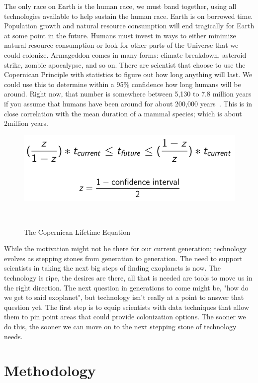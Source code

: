 \documentclass[letterpaper, 10 pt, conference]{ieeeconf}  %
\begin{document}
The only race on Earth is the human race, we must band together, using all technologies available to help sustain the human race. Earth is on borrowed time. Population growth and natural resource consumption will end tragically for Earth at some point in the future. Humans must invest in ways to either minimize natural resource consumption or look for other parts of the Universe that we could colonize. Armageddon comes in many forms: climate breakdown, asteroid strike, zombie apocalypse, and so on. There are scientist that choose to use the Copernican Principle with statistics to figure out how long anything will last. We could use this to determine within a 95\% confidence how long humans will be around. Right now, that number is somewhere between 5,130 to 7.8 million years if you assume that humans have been around for about 200,000 years~\cite{Koehrsen2018}. This is in close correlation with the mean duration of a mammal species; which is about 2million years. 

\begin{figure}
	\centering
	\includegraphics[width=0.7\linewidth]{Images/Formula}
	\caption[The Copernican Lifetime Equation]{The Copernican Lifetime Equation}~\cite{Koehrsen2018}
	\label{fig:formula}
\end{figure}

While the motivation might not be there for our current generation; technology evolves as stepping stones from generation to generation. The need to support scientists in taking the next big steps of finding exoplanets is now. The technology is ripe, the desires are there, all that is needed are tools to move us in the right direction. The next question in generations to come might be, "how do we get to said exoplanet", but technology isn't really at a point to answer that question yet. The first step is to equip scientists with data techniques that allow them to pin point areas that could provide colonization options. The sooner we do this, the sooner we can move on to the next stepping stone of technology needs.

\section{Methodology}
\end{document}
